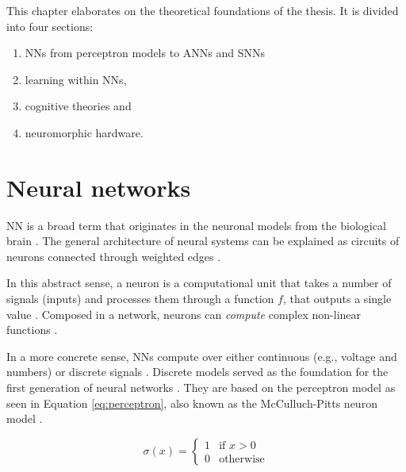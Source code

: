 \documentclass[report.tex]{subfiles}
\begin{document}
This chapter elaborates on the theoretical foundations of the thesis.
It is divided into four sections: 

\begin{enumerate}
  \item \glspl{NN} from perceptron models to \glspl{ANN} and \glspl{SNN}
  \item learning within \glspl{NN}, 
  \item cognitive theories and
  \item neuromorphic hardware.
\end{enumerate}

\section{Neural networks} \label{sec:nn}
\gls{NN} is a broad term that originates in the neuronal models from
the biological brain \cite{Dayan2001}.
The general architecture of neural systems can be explained as circuits
of neurons  connected through weighted edges
\cite{Russel2007, Dayan2001}.

In this abstract sense, a neuron is a computational unit that
takes a number of signals (inputs) and processes them through a
function $f$, that outputs a single value \cite{Eliasmith2004}.
Composed in a network, neurons can \textit{compute} 
complex non-linear functions \cite{Eliasmith2004, Dayan2001}.

In a more concrete sense, \glspl{NN} compute over either
continuous (e.g., voltage and numbers) or discrete signals
\cite{Russel2007, Schmidhuber2014}.
Discrete models served as the foundation for
the first generation of neural networks \cite{Russel2007, Maass1997}.
They are based on the perceptron model as seen in Equation
\ref{eq:perceptron}, also known as the McCulluch-Pitts neuron model
\cite{Eliasmith2004}.

\begin{equation} \label{eq:perceptron}
\sigma(x) = \begin{cases}
	 1 & \text{if } x > 0\\
	 0 & \text{otherwise}
       \end{cases}
\end{equation}
\end{document}
